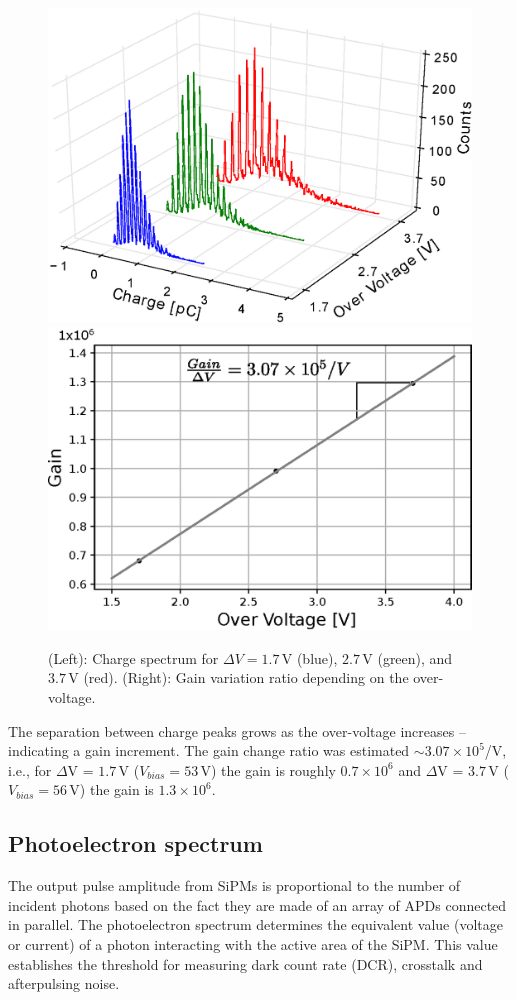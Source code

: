 \documentclass[a4paper,11pt]{article}
\begin{document}
\begin{figure}[htbp]
\centering %
\includegraphics[width=.49\textwidth]{Figures/GainCharge_enhanced.eps}
\quad
\includegraphics[width=.47\textwidth]{Figures/G_OV_1350CS.eps}
\caption{\label{fig:gain} (Left): Charge spectrum for $\Delta V=1.7$\,V (blue), $2.7$\,V (green), and $3.7$\,V (red). (Right): Gain variation ratio depending on the over-voltage.}
\end{figure}

The separation between charge peaks grows as the over-voltage increases --indicating a gain increment. The gain change ratio was estimated $\sim3.07\times10^5$/V, i.e., for $\Delta$V = $1.7$\,V ($V_{bias} = 53$\,V) the gain is roughly $0.7\times10^6$ and $\Delta$V = $3.7$\,V ($V_{bias} = 56$\,V) the gain is $1.3\times10^6$.

\subsection{Photoelectron spectrum}

The output pulse amplitude from SiPMs is proportional to the number of incident photons based on the fact they are made of an array of APDs connected in parallel. The photoelectron spectrum determines the equivalent value (voltage or current) of a photon interacting with the active area of the SiPM. This value establishes the threshold for measuring dark count rate (DCR), crosstalk and afterpulsing noise.
\end{document}

